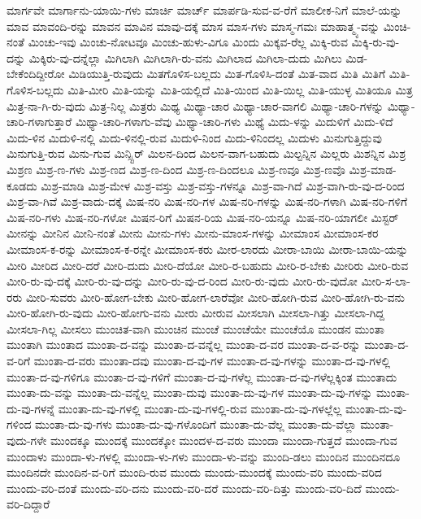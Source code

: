 {ಮಾರ್ಗವೇ
ಮಾರ್ಗಾನು-ಯಾಯಿ-ಗಳು
ಮಾರ್ಚಿ
ಮಾರ್ಚ್
ಮಾರ್ಪಡಿ-ಸುವ-ವ-ರೆಗೆ
ಮಾಲೀಕ-ನಿಗೆ
ಮಾಲೆ-ಯನ್ನು
ಮಾವ
ಮಾವಂದಿ-ರನ್ನು
ಮಾವನ
ಮಾವಿನ
ಮಾವು-ದಕ್ಕೆ
ಮಾಸ
ಮಾಸ-ಗಳು
ಮಾಸ್ಮ-ಗಮಃ
ಮಾಹಾತ್ಮ್ಯ-ವನ್ನು
ಮಿಂಚಿ-ನಂತೆ
ಮಿಂಚು-ಇವು
ಮಿಂಚು-ನೋಟವೂ
ಮಿಂಚು-ಹುಳು-ವಿಗೂ
ಮಿಂದು
ಮಿಕ್ಕವ-ರೆಲ್ಲ
ಮಿಕ್ಕಿ-ರುವ
ಮಿಕ್ಕಿ-ರು-ವು-ದನ್ನು
ಮಿಕ್ಕಿರು-ವು-ದನ್ನೆಲ್ಲಾ
ಮಿಗಿಲಾಗಿ
ಮಿಗಿಲಾಗಿ-ರು-ವನು
ಮಿಗಿಲಾದ
ಮಿಗಿಲಾ-ದುದು
ಮಿಗಿಲು
ಮಿಡ-ಬೇಕೆಂದಿದ್ದೀರೋ
ಮಿಡಿಯುತ್ತಿ-ರುವುದು
ಮಿತಗೊಳಿಸ-ಬಲ್ಲದು
ಮಿತ-ಗೊಳಿಸಿ-ದಂತೆ
ಮಿತ-ವಾದ
ಮಿತಿ
ಮಿತಿಗೆ
ಮಿತಿ-ಗೊಳಿಸ-ಬಲ್ಲದು
ಮಿತಿ-ಮೀರಿ
ಮಿತಿ-ಯನ್ನು
ಮಿತಿ-ಯಲ್ಲಿದೆ
ಮಿತಿ-ಯಿಂದ
ಮಿತಿ-ಯಿಲ್ಲ
ಮಿತಿ-ಯುಳ್ಳ
ಮಿತಿಯೂ
ಮಿತ್ರ
ಮಿತ್ರ-ನಾ-ಗಿ-ರು-ವುದು
ಮಿತ್ರ-ನಿಲ್ಲ
ಮಿತ್ರರು
ಮಿಥ್ಯ
ಮಿಥ್ಯಾ-ಚಾರ
ಮಿಥ್ಯಾ-ಚಾರ-ವಾಗಲಿ
ಮಿಥ್ಯಾ-ಚಾರಿ-ಗಳನ್ನು
ಮಿಥ್ಯಾ-ಚಾರಿ-ಗಳಾಗುತ್ತಾರೆ
ಮಿಥ್ಯಾ-ಚಾರಿ-ಗಳಾಗು-ವೆವು
ಮಿಥ್ಯಾ-ಚಾರಿ-ಗಳು
ಮಿಥ್ಯೆ
ಮಿದು-ಳನ್ನು
ಮಿದುಳಿಗೆ
ಮಿದು-ಳಿದೆ
ಮಿದು-ಳಿನ
ಮಿದುಳಿ-ನಲ್ಲಿ
ಮಿದು-ಳಿನಲ್ಲಿ-ರುವ
ಮಿದುಳಿ-ನಿಂದ
ಮಿದು-ಳಿನಿಂದಲ್ಲ
ಮಿದುಳು
ಮಿನುಗುತ್ತಿದ್ದುವು
ಮಿನುಗುತ್ತಿ-ರುವ
ಮಿನು-ಗುವ
ಮಿನ್ಸ್ಟಿರ್
ಮಿಲನ-ದಿಂದ
ಮಿಲನ-ವಾಗ-ಬಹುದು
ಮಿಲ್ಟನ್ನಿನ
ಮಿಲ್ಲರು
ಮಿಶನ್ನಿನ
ಮಿಶ್ರ
ಮಿಶ್ರಣ
ಮಿಶ್ರ-ಣ-ಗಳು
ಮಿಶ್ರ-ಣದ
ಮಿಶ್ರ-ಣ-ದಿಂದ
ಮಿಶ್ರ-ಣ-ದಿಂದಲೂ
ಮಿಶ್ರ-ಣವೂ
ಮಿಶ್ರ-ಣವೊ
ಮಿಶ್ರ-ಮಾಡ-ಕೂಡದು
ಮಿಶ್ರ-ಮಾಡಿ
ಮಿಶ್ರ-ಮೇಳ
ಮಿಶ್ರ-ವಸ್ತು
ಮಿಶ್ರ-ವಸ್ತು-ಗಳನ್ನೂ
ಮಿಶ್ರ-ವಾ-ಗಿದೆ
ಮಿಶ್ರ-ವಾಗಿ-ರು-ವು-ದ-ರಿಂದ
ಮಿಶ್ರ-ವಾ-ಗಿವೆ
ಮಿಶ್ರ-ವಾದು-ದಕ್ಕೆ
ಮಿಷ-ನರಿ
ಮಿಷ-ನರಿ-ಗಳ
ಮಿಷ-ನರಿ-ಗಳನ್ನು
ಮಿಷ-ನರಿ-ಗಳಾಗಿ
ಮಿಷ-ನರಿ-ಗಳಿಗೆ
ಮಿಷ-ನರಿ-ಗಳು
ಮಿಷ-ನರಿ-ಗಳೋ
ಮಿಷನ-ರಿಗೆ
ಮಿಷನ-ರಿಯ
ಮಿಷ-ನರಿ-ಯನ್ನೂ
ಮಿಷ-ನರಿ-ಯಾಗಲೀ
ಮಿಸ್ಟರ್
ಮೀನನ್ನು
ಮೀನಿನ
ಮೀನಿ-ನಂತೆ
ಮೀನು
ಮೀನು-ಗಳು
ಮೀನು-ಮಾಂಸ-ಗಳನ್ನು
ಮೀಮಾಂಸ
ಮೀಮಾಂಸ-ಕರ
ಮೀಮಾಂಸ-ಕ-ರನ್ನು
ಮೀಮಾಂಸ-ಕ-ರನ್ನೇ
ಮೀಮಾಂಸ-ಕರು
ಮೀರ-ಲಾರದು
ಮೀರಾ-ಬಾಯಿ
ಮೀರಾ-ಬಾಯಿ-ಯನ್ನು
ಮೀರಿ
ಮೀರಿದ
ಮೀರಿ-ದರೆ
ಮೀರಿ-ದುದು
ಮೀರಿ-ದೆಯೋ
ಮೀರಿ-ರ-ಬಹುದು
ಮೀರಿ-ರ-ಬೇಕು
ಮೀರಿರು
ಮೀರಿ-ರುವ
ಮೀರಿ-ರು-ವು-ದಕ್ಕೆ
ಮೀರಿ-ರು-ವು-ದನ್ನು
ಮೀರಿ-ರು-ವು-ದ-ರಿಂದ
ಮೀರಿ-ರು-ವುದು
ಮೀರಿ-ರು-ವುದೋ
ಮೀರಿ-ಸ-ಲಾ-ರರು
ಮೀರಿ-ಸುವರು
ಮೀರಿ-ಹೋಗ-ಬೇಕು
ಮೀರಿ-ಹೋಗ-ಲಾರೆವೋ
ಮೀರಿ-ಹೋಗಿ-ರುವ
ಮೀರಿ-ಹೋಗಿ-ರು-ವನು
ಮೀರಿ-ಹೋಗಿ-ರು-ವುದು
ಮೀರಿ-ಹೋಗು-ವನು
ಮೀರು
ಮೀರುವ
ಮೀಸಲಾಗಿ
ಮೀಸಲಾ-ಗಿತ್ತು
ಮೀಸಲಾ-ಗಿದ್ದ
ಮೀಸಲಾ-ಗಿಲ್ಲ
ಮೀಸಲು
ಮುಂಚಿತ-ವಾಗಿ
ಮುಂಚಿನ
ಮುಂಚೆ
ಮುಂಚೆಯೇ
ಮುಂಚೆಯೊ
ಮುಂಡನ
ಮುಂತಾ
ಮುಂತಾಗಿ
ಮುಂತಾದ
ಮುಂತಾ-ದ-ವನ್ನು
ಮುಂತಾ-ದ-ವನ್ನೆಲ್ಲ
ಮುಂತಾ-ದ-ವರ
ಮುಂತಾ-ದ-ವ-ರನ್ನು
ಮುಂತಾ-ದ-ವ-ರಿಗೆ
ಮುಂತಾ-ದ-ವರು
ಮುಂತಾ-ದವು
ಮುಂತಾ-ದ-ವು-ಗಳ
ಮುಂತಾ-ದ-ವು-ಗಳನ್ನು
ಮುಂತಾ-ದ-ವು-ಗಳಲ್ಲಿ
ಮುಂತಾ-ದ-ವು-ಗಳಿಗೂ
ಮುಂತಾ-ದ-ವು-ಗಳಿಗೆ
ಮುಂತಾ-ದ-ವು-ಗಳೆಲ್ಲ
ಮುಂತಾ-ದ-ವು-ಗಳೆಲ್ಲಕ್ಕಿಂತ
ಮುಂತಾದು
ಮುಂತಾ-ದು-ವನ್ನು
ಮುಂತಾ-ದು-ವನ್ನೆಲ್ಲ
ಮುಂತಾ-ದುವು
ಮುಂತಾ-ದು-ವು-ಗಳ
ಮುಂತಾ-ದು-ವು-ಗಳನ್ನು
ಮುಂತಾ-ದು-ವು-ಗಳನ್ನೆ
ಮುಂತಾ-ದು-ವು-ಗಳಲ್ಲಿ
ಮುಂತಾ-ದು-ವು-ಗಳಲ್ಲಿ-ರುವ
ಮುಂತಾ-ದು-ವು-ಗಳಲ್ಲೆಲ್ಲ
ಮುಂತಾ-ದು-ವು-ಗಳಿಂದ
ಮುಂತಾ-ದು-ವು-ಗಳು
ಮುಂತಾ-ದು-ವು-ಗಳೊಂದಿಗೆ
ಮುಂತಾ-ದು-ವೆಲ್ಲ
ಮುಂತಾ-ದು-ವೆಲ್ಲಾ
ಮುಂತಾ-ವುದು-ಗಳೇ
ಮುಂದಕ್ಕೂ
ಮುಂದಕ್ಕೆ
ಮುಂದಕ್ಕೋ
ಮುಂದಳ-ದ-ವರು
ಮುಂದಾ
ಮುಂದಾ-ಗುತ್ತದೆ
ಮುಂದಾ-ಗುವ
ಮುಂದಾಳು
ಮುಂದಾ-ಳು-ಗಳಲ್ಲಿ
ಮುಂದಾ-ಳು-ಗಳು
ಮುಂದಾ-ಳು-ವನ್ನು
ಮುಂದಿ-ಡಲು
ಮುಂದಿನ
ಮುಂದಿನದೂ
ಮುಂದಿನದೇ
ಮುಂದಿನ-ವ-ರಿಗೆ
ಮುಂದಿ-ರುವ
ಮುಂದು
ಮುಂದು-ಮುಂದಕ್ಕೆ
ಮುಂದು-ವರಿ
ಮುಂದು-ವರಿದ
ಮುಂದು-ವರಿ-ದಂತೆ
ಮುಂದು-ವರಿ-ದನು
ಮುಂದು-ವರಿ-ದರೆ
ಮುಂದು-ವರಿ-ದಿತ್ತು
ಮುಂದು-ವರಿ-ದಿದೆ
ಮುಂದು-ವರಿ-ದಿದ್ದಾರೆ
}

